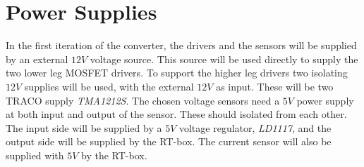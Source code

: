 \section{Power Supplies}\label{power_supplies}
In the first iteration of the converter, the drivers and the sensors will be supplied by an external $12V$ voltage source. This source will be used directly to supply the two lower leg MOSFET drivers. To support the higher leg drivers two isolating $12V$ supplies will be used, with the external $12V$ as input. These will be two TRACO supply \textit{TMA1212S}. The chosen voltage sensors need a $5V$ power supply at both input and output of the sensor. These should isolated from each other. The input side will be supplied by a $5V$ voltage regulator, \textit{LD1117}, and the output side will be supplied by the RT-box. The current sensor will also be supplied with $5V$ by the RT-box.